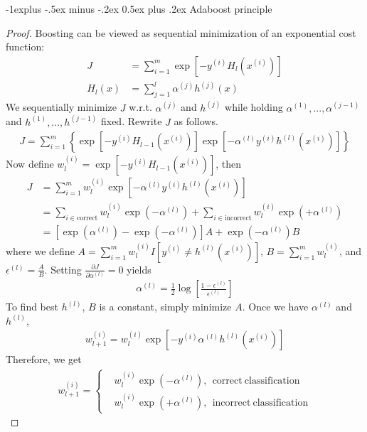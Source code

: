 \documentclass[10pt,landscape]{article}
\makeatletter
\renewcommand{\subsection}{\@startsection{subsection}{2}{0mm}%
                                {-1explus -.5ex minus -.2ex}%
                                {0.5ex plus .2ex}%
                                {\normalfont\small\bfseries}}
\makeatother
\begin{document}
\begin{multicols}{3}
\subsection{Adaboost principle}
\begin{proof}
	Boosting can be viewed as sequential minimization of an exponential cost function:
	\begin{align*}
		J &= \sum_{i=1}^m \exp{\left[ -y^{(i)} H_l(x^{(i)}) \right]}\\
		H_l(x) &= \sum_{j=1}^l \alpha^{(j)} h^{(j)}(x)
	\end{align*}
	We sequentially minimize $J$ w.r.t. $\alpha^{(j)}$ and $h^{(j)}$ while holding $\alpha^{(1)}, ..., \alpha^{(j-1)}$ and $h^{(1)}, ..., h^{(j-1)}$ fixed. Rewrite $J$ as follows.
	\begin{align*}
		J = \sum_{i=1}^m \left\{ \exp{\left[ -y^{(i)} H_{l-1}(x^{(i)}) \right]} \exp{\left[ -\alpha^{(l)} y^{(i)} h^{(l)}(x^{(i)}) \right]} \right\}
	\end{align*}
	Now define $w_l^{(i)} = \exp{\left[ -y^{(i)} H_{l-1}(x^{(i)}) \right]}$, then
	\begin{align*}
		J &= \sum_{i=1}^m w_l^{(i)} \exp{\left[ -\alpha^{(l)} y^{(i)} h^{(l)}(x^{(i)}) \right]}\\
		&= \sum_{i \in \mathrm{correct}} w_l^{(i)} \exp{\left( -\alpha^{(l)} \right)} + \sum_{i \in \mathrm{incorrect}} w_l^{(i)} \exp{\left( +\alpha^{(l)} \right)}\\
		&= \left[ \exp{\left( \alpha^{(l)} \right)} - \exp{\left( -\alpha^{(l)} \right)} \right] A + \exp{\left( -\alpha^{(l)} \right)} B
	\end{align*}
	where we define $A = \sum_{i=1}^m w_l^{(i)} I \left[ y^{(i)} \neq h^{(l)}(x^{(i)}) \right]$, $B = \sum_{i=1}^m w_l^{(i)}$, and $\epsilon^{(l)} = \frac{A}{B}$. Setting $\frac{\partial J}{\partial \alpha^{(l)}} = 0$ yields
	\begin{align*}
		\alpha^{(l)} = \frac{1}{2}\log{ \left[ \frac{1 - \epsilon^{(l)}}{\epsilon^{(l)}} \right] }
	\end{align*}
	To find best $h^{(l)}$, $B$ is a constant, simply minimize $A$. Once we have $\alpha^{(l)}$ and $h^{(l)}$,
	\begin{align*}
		w_{l+1}^{(i)} = w_l^{(i)} \exp{ \left[ -y^{(i)} \alpha^{(l)} h^{(l)}(x^{(i)}) \right] }
	\end{align*}
	Therefore, we get
	\begin{align*}
		w_{l+1}^{(i)} = \left\{
		\begin{aligned}
			&w_l^{(i)} \exp{\left( -\alpha^{(l)} \right)}, \ \ \mathrm{correct \ classification}\\
			&w_l^{(i)} \exp{\left( +\alpha^{(l)} \right)}, \ \ \mathrm{incorrect \ classification}
		\end{aligned}
		\right.
	\end{align*}
\end{proof}


\end{multicols}
\end{document}
